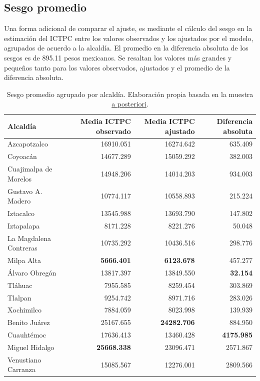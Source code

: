 \documentclass[11pt]{article}
\begin{document}
\subsection{Sesgo promedio}

Una forma adicional de comparar el ajuste, es mediante el cálculo del sesgo en la estimación del ICTPC entre los valores observados y los ajustados por el modelo, agrupados de acuerdo a la alcaldía. El promedio en la diferencia absoluta de los sesgos es de 895.11 pesos mexicanos. Se resaltan los valores más grandes y pequeños tanto para los valores observados, ajustados y el promedio de la diferencia absoluta.

\begin{table}[H]
\caption{Sesgo promedio agrupado por alcaldía. Elaboración propia basada en la muestra \underline{a posteriori}.}
\label{tab:sesgo}
\centering
\begin{tabular}{l|r|r|r}
\hline
Alcaldía & Media ICTPC observado & Media ICTPC  ajustado & Diferencia absoluta \\
\hline
Azcapotzalco & 16910.051 & 16274.642 & 635.409\\
\hline
Coyoacán & 14677.289 & 15059.292 & 382.003\\
\hline
Cuajimalpa de Morelos & 14948.206 & 14014.203 & 934.003\\
\hline
Gustavo A. Madero & 10774.117 & 10558.893 & 215.224\\
\hline
Iztacalco & 13545.988 & 13693.790 & 147.802\\
\hline
Iztapalapa & 8171.228 & 8221.276 & 50.048\\
\hline
La Magdalena Contreras & 10735.292 & 10436.516 & 298.776\\
\hline
Milpa Alta & \bfseries 5666.401 & \bfseries 6123.678 & 457.277\\
\hline
Álvaro Obregón & 13817.397 & 13849.550 & \bfseries 32.154\\
\hline
Tláhuac & 7955.585 & 8259.454 & 303.869\\
\hline
Tlalpan & 9254.742 & 8971.716 & 283.026\\
\hline
Xochimilco & 7884.059 & 8023.998 & 139.939\\
\hline
Benito Juárez & 25167.655 & \bfseries 24282.706 & 884.950\\
\hline
Cuauhtémoc & 17636.413 & 13460.428 & \bfseries 4175.985\\
\hline
Miguel Hidalgo & \bfseries 25668.338 & 23096.471 & 2571.867\\
\hline
Venustiano Carranza & 15085.567 & 12276.001 & 2809.566\\
\hline
\end{tabular}
\end{table}
\end{document}
